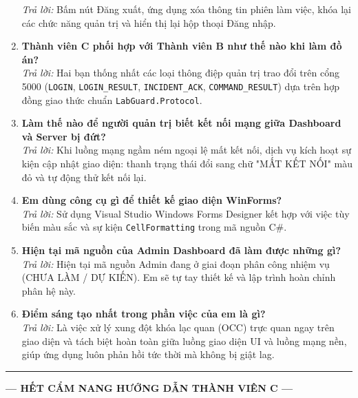 \documentclass[12pt,a4paper]{article}
\begin{document}
\begin{enumerate}[leftmargin=*, label=\textbf{Câu \arabic*:}]
    \textit{Trả lời:} Bấm nút Đăng xuất, ứng dụng xóa thông tin phiên làm việc, khóa lại các chức năng quản trị và hiển thị lại hộp thoại Đăng nhập.
  \item \textbf{Thành viên C phối hợp với Thành viên B như thế nào khi làm đồ án?} \\
    \textit{Trả lời:} Hai bạn thống nhất các loại thông điệp quản trị trao đổi trên cổng 5000 (\texttt{LOGIN}, \texttt{LOGIN\_RESULT}, \texttt{INCIDENT\_ACK}, \texttt{COMMAND\_RESULT}) dựa trên hợp đồng giao thức chuẩn \texttt{LabGuard.Protocol}.
  \item \textbf{Làm thế nào để người quản trị biết kết nối mạng giữa Dashboard và Server bị đứt?} \\
    \textit{Trả lời:} Khi luồng mạng ngầm ném ngoại lệ mất kết nối, dịch vụ kích hoạt sự kiện cập nhật giao diện: thanh trạng thái đổi sang chữ "MẤT KẾT NỐI" màu đỏ và tự động thử kết nối lại.
  \item \textbf{Em dùng công cụ gì để thiết kế giao diện WinForms?} \\
    \textit{Trả lời:} Sử dụng Visual Studio Windows Forms Designer kết hợp với việc tùy biến màu sắc và sự kiện \texttt{CellFormatting} trong mã nguồn C\#.
  \item \textbf{Hiện tại mã nguồn của Admin Dashboard đã làm được những gì?} \\
    \textit{Trả lời:} Hiện tại mã nguồn Admin đang ở giai đoạn phân công nhiệm vụ (CHƯA LÀM / DỰ KIẾN). Em sẽ tự tay thiết kế và lập trình hoàn chỉnh phân hệ này.
  \item \textbf{Điểm sáng tạo nhất trong phần việc của em là gì?} \\
    \textit{Trả lời:} Là việc xử lý xung đột khóa lạc quan (OCC) trực quan ngay trên giao diện và tách biệt hoàn toàn giữa luồng giao diện UI và luồng mạng nền, giúp ứng dụng luôn phản hồi tức thời mà không bị giật lag.
\end{enumerate}

\begin{center}
  \vspace{10mm}
  {\color{lgDeepBlue}\hrule height 1pt}
  \vspace{4mm}
  {\bfseries\color{lgSlate} — HẾT CẨM NANG HƯỚNG DẪN THÀNH VIÊN C —\par}
\end{center}
\end{document}
